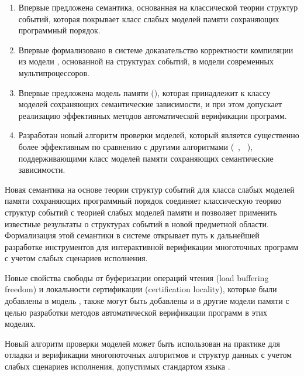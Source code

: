 {\novelty}
\begin{enumerate}[beginpenalty=10000] %

  \item Впервые предложена семантика, основанная на классической теории структур событий,
    которая покрывает класс слабых моделей памяти сохраняющих программный порядок.

  \item Впервые формализовано в системе \coq доказательство корректности компиляции
    из модели \Wkm, основанной на структурах событий, 
    в модели современных мультипроцессоров.  

  \item Впервые предложена модель памяти (\WkmS),
    которая принадлежит к классу моделей сохраняющих семантические зависимости, 
    и при этом допускает реализацию эффективных методов автоматической верификации программ. 

  \item Разработан новый алгоритм проверки моделей, который является существенно
    более эффективным по сравнению с другими алгоритмами
    (\CDSChecker~\autocite{Norris-Demsky:OOPSLA2013}, \rmem~\autocite{Pulte-al:PLDI2019}),
    поддерживающими класс моделей памяти сохраняющих семантические зависимости.

\end{enumerate}

{\influence} 

Новая семантика на основе теории структур событий 
для класса слабых моделей памяти сохраняющих программный порядок
соединяет классическую теорию структур событий 
с теорией слабых моделей памяти и позволяет применить известные результаты 
о структурах событий в новой предметной области.  
Формализация этой семантики в системе \coq открывает 
путь к дальнейшей разработке инструментов для  
интерактивной верификации многоточных программ  
с учетом слабых сценариев исполнения. 
 
Новые свойства свободы от буферизации операций чтения (load buffering freedom)
и локальности сертификации (certification locality), 
которые были добавлены в модель \WkmS, 
также могут быть добавлены и в другие модели памяти 
с целью разработки методов автоматической верификации программ в этих моделях. 

Новый алгоритм проверки моделей может быть использован на практике
для отладки и верификации многопоточных алгоритмов и структур данных 
с учетом слабых сценариев исполнения, допустимых стандартом языка \CLANG. 

